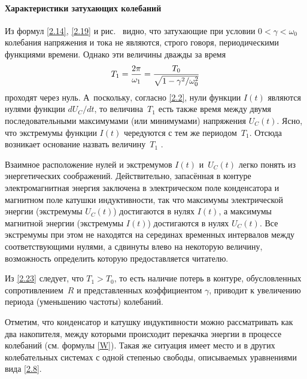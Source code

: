 \paragraph{Характеристики затухающих колебаний}

Из формул \eqref{2.14}, \eqref{2.19} и рис.~ видно, что затухающие
при условии $0<\gamma<\omega_0$ колебания напряжения и тока не являются,
строго говоря, периодическими функциями времени. 
Однако эти величины дважды за время
\begin{equation}\eqmark{2.23}
T_1=\dfrac{2\pi}{\omega_1}=\dfrac{T_0}{\sqrt{1-\gamma^2/\omega_0^2}}
\end{equation}
проходят через нуль. А~поскольку, согласно \eqref{2.2}, нули функции $I(t)$ являются
нулями функции $dU_C/dt$, то величина~$T_1$ есть также время между двумя
последовательными максимумами (или минимумами) напряжения $U_C(t)$.
Ясно, что экстремумы функции $I(t)$ чередуются с тем же периодом~$T_1$. 
Отсюда возникает основание назвать величину~$T_1$ 
.

Взаимное расположение нулей и экстремумов $I(t)$ и~$U_C(t)$ легко понять из
энергетических соображений. Действительно, запасённая в контуре электромагнитная
энергия заключена в электрическом поле конденсатора и магнитном поле катушки
индуктивности, так что максимумы электрической энергии (экстремумы $U_C(t)$)
достигаются в нулях $I(t)$, а максимумы магнитной энергии (экстремумы $I(t)$)
достигаются в нулях $U_C(t)$. Все экстремумы при этом не находятся на серединах 
временных интервалов между соответствующими нулями, а сдвинуты влево на некоторую 
величину, возможность определить которую предоставляется читателю.

Из \eqref{2.23} следует, что $T_1>T_0$, то есть наличие потерь в
контуре, обусловленных сопротивлением~$R$ и представленных коэффициентом
$\gamma$, приводит к увеличению периода (уменьшению частоты) колебаний.

Отметим, что конденсатор и катушку индуктивности можно рассматривать как два 
накопителя, между которыми происходит перекачка энергии в процессе колебаний
(см. формулы \eqref{W}). 
Такая же ситуация имеет место и в других колебательных системах с одной степенью 
свободы, описываемых уравнениями вида \eqref{2.8}.



